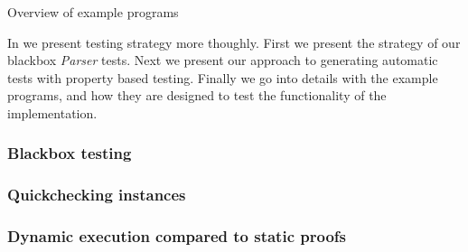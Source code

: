 \begin{table}[h!]

\caption{Overview of example programs}
\label{table:testprograms}
\end{table}

In  we present testing strategy more thoughly.
First we present the strategy of our blackbox \textit{Parser} tests. 
Next we present our approach to generating automatic tests with property based testing. 
Finally we go into details with the example programs, and how they are designed to test the functionality of the implementation.

\subsubsection{Blackbox testing}\label{sec:blackbox}


\subsubsection{Quickchecking instances}\label{sec:qc}


\subsubsection{Dynamic execution compared to static proofs}\label{sec:examples}


